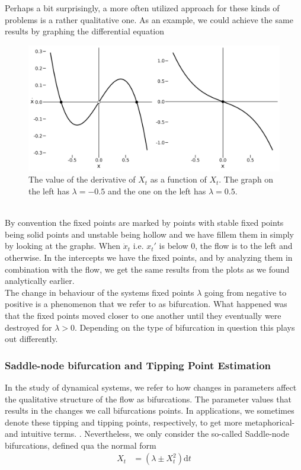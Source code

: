 Perhaps a bit surprisingly, a more often utilized approach for these kinds of problems is a rather qualitative one. As an example, we could achieve the same results by graphing the differential equation
\begin{figure}[h]
    \begin{center}
        \includegraphics[scale = .125]{figures/double_well_plot_combined.jpeg}
        \caption{The value of the derivative of $X_t$ as a function of $X_t$.
        The graph on the left has $\lambda = -0.5$ and the one on the left has $\lambda = 0.5$.}
    \end{center}
\end{figure}\\
By convention the fixed points are marked by points with stable fixed points being solid points and unstable being hollow and we have fillem them in simply by looking at the graphs. When $\dot{x}_t$ i.e. $x_t'$ is below 0, the flow is to the left and otherwise. In the intercepts we have the fixed points, and by analyzing them in combination with the flow, we get the same results from the plots as we found analytically earlier. \\
The change in behaviour of the systems fixed points $\lambda$ going from negative to positive is a phenomenon that we refer to as bifurcation. What happened was that the fixed points moved closer to one another until they eventually were destroyed for $\lambda > 0$. Depending on the type of bifurcation in question this plays out differently. 
\subsubsection{Saddle-node bifurcation and Tipping Point Estimation}
In the study of dynamical systems, we refer to how changes in parameters affect the qualitative structure of the flow as bifurcations. The parameter values that results in the changes we call bifurcations points. In applications, we sometimes denote these tipping and tipping points, respectively, to get more metaphorical- and intuitive terms. \cite{Strogatz2019_gv}. Nevertheless, we only consider the so-called Saddle-node bifurcations, defined qua the normal form
\begin{align}
    X_t &= \left(\lambda \pm X_t^2\right) \mathrm{d}t \label{standardForm}
\end{align}

